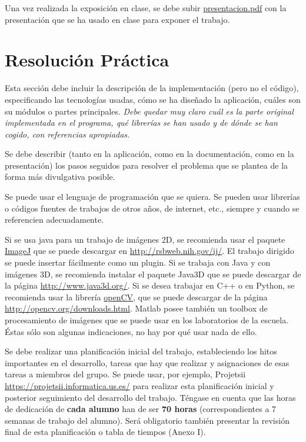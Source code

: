 \documentclass{pid}
\begin{document}
Una vez realizada la exposición en clase, se debe subir \url{presentacion.pdf} con la presentación que se ha usado en clase para exponer el trabajo.


\section{Resolución Práctica}

Esta sección debe incluir la descripción de la implementación (pero no el código), especificando las tecnologías usadas, cómo se ha diseñado la aplicación, cuáles son su módulos o partes principales. {\it Debe quedar muy claro cuál es la parte original implementada en el programa, qué librerías se han usado y de dónde se han cogido, con referencias apropiadas.}

Se debe describir (tanto en la aplicación, como en la documentación, como en la presentación) los pasos seguidos para resolver el problema que se plantea de la forma más divulgativa posible.

Se puede usar el lenguaje de programación que se quiera. Se pueden usar librerías o códigos fuentes de trabajos de otros años, de internet, etc., siempre y cuando se referencien adecuadamente.

Si se usa java para un trabajo de imágenes 2D, se recomienda usar el paquete \url{ImageJ} que se puede descargar en \url{http://rsbweb.nih.gov/ij/}. El trabajo dirigido se puede insertar fácilmente como un plugin. Si se trabaja con Java y con imágenes 3D, se recomienda instalar el paquete Java3D que se puede descargar de la página \url{http://www.java3d.org/}. Si se desea trabajar en C++ o en Python, se recomienda usar la librería \url{openCV}, que se puede descargar de la página \url{http://opencv.org/downloads.html}. Matlab posee también un toolbox de procesamiento de imágenes que se puede usar en los laboratorios de la escuela. Éstas sólo son algunas indicaciones, no hay por qué usar nada de ello.

Se debe realizar una planificación inicial del trabajo, estableciendo los hitos importantes en el desarrollo, tareas que hay que realizar y asignaciones de esas tareas a miembros del grupo. Se puede usar, por ejemplo, Projetsii \url{https://projetsii.informatica.us.es/} para realizar esta planificación inicial y posterior seguimiento del desarrollo del trabajo. Téngase en cuenta que las horas de dedicación de {\bf cada alumno} han de ser {\bf 70 horas} (correspondientes a 7 semanas de trabajo del alumno). Será obligatorio también presentar la revisión final de esta planificación o tabla de tiempos (Anexo I).
\end{document}
